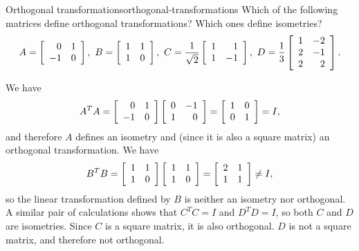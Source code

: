 \documentclass{ximera}
\begin{document}
\begin{example}{Orthogonal transformations}{orthogonal-transformations}
  Which of the following matrices define orthogonal transformations?
  Which ones define isometries?
  \begin{equation*}
    A = \startmat{rr}
      0  & 1 \\
      -1 & 0 \\
    \stopmat,\quad
    B = \startmat{rr}
      1 & 1 \\
      1 & 0 \\
    \stopmat,\quad
    C = \frac{1}{\sqrt{2}}\startmat{rr}
      1 & 1 \\
      1 & -1 \\
    \stopmat,\quad
    D = \frac{1}{3}\startmat{rr}
      1 & -2 \\
      2 & -1 \\
      2 &  2 \\
    \stopmat.
  \end{equation*}
\end{example}

\begin{solution}
  We have
  \begin{equation*}
    A^TA = \startmat{rr}
      0  & 1 \\
      -1 & 0 \\
    \stopmat\startmat{rr}
      0  & -1 \\
      1 & 0 \\
    \stopmat = \startmat{rr}
      1 & 0 \\
      0 & 1 \\
    \stopmat = I,
  \end{equation*}
  and therefore $A$ defines an isometry and (since it is also a square
  matrix) an orthogonal transformation. We have
  \begin{equation*}
    B^TB = \startmat{rr}
      1 & 1 \\
      1 & 0 \\
    \stopmat\startmat{rr}
      1 & 1 \\
      1 & 0 \\
    \stopmat = \startmat{rr}
      2 & 1 \\
      1 & 1 \\
    \stopmat \neq I,
  \end{equation*}
  so the linear transformation defined by $B$ is neither an isometry
  nor orthogonal. A similar pair of calculations shows that $C^TC=I$
  and $D^TD=I$, so both $C$ and $D$ are isometries. Since $C$ is a
  square matrix, it is also orthogonal. $D$ is not a square matrix,
  and therefore not orthogonal.
\end{solution}
\end{document}
